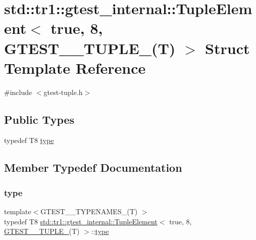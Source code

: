 \hypertarget{structstd_1_1tr1_1_1gtest__internal_1_1_tuple_element_3_01true_00_018_00_01_g_t_e_s_t__10___t_u_p_l_e___07_t_08_01_4}{}\section{std\+::tr1\+::gtest\+\_\+internal\+::Tuple\+Element$<$ true, 8, G\+T\+E\+S\+T\+\_\+\_\+\+T\+U\+P\+L\+E\+\_\+(T) $>$ Struct Template Reference}
\label{structstd_1_1tr1_1_1gtest__internal_1_1_tuple_element_3_01true_00_018_00_01_g_t_e_s_t__10___t_u_p_l_e___07_t_08_01_4}


{\ttfamily \#include $<$gtest-\/tuple.\+h$>$}

\subsection*{Public Types}
\begin{DoxyCompactItemize}
\item 
typedef T8 \mbox{\hyperlink{structstd_1_1tr1_1_1gtest__internal_1_1_tuple_element_3_01true_00_018_00_01_g_t_e_s_t__10___t_u_p_l_e___07_t_08_01_4_a7b4d456a790291b651b4179650754587}{type}}
\end{DoxyCompactItemize}


\subsection{Member Typedef Documentation}
\mbox{\label{structstd_1_1tr1_1_1gtest__internal_1_1_tuple_element_3_01true_00_018_00_01_g_t_e_s_t__10___t_u_p_l_e___07_t_08_01_4_a7b4d456a790291b651b4179650754587}} 
\subsubsection{\texorpdfstring{type}{type}}
{\footnotesize\ttfamily template$<$G\+T\+E\+S\+T\+\_\+\_\+\+T\+Y\+P\+E\+N\+A\+M\+E\+S\+\_\+(\+T) $>$ \\
typedef T8 \mbox{\hyperlink{structstd_1_1tr1_1_1gtest__internal_1_1_tuple_element}{std\+::tr1\+::gtest\+\_\+internal\+::\+Tuple\+Element}}$<$ true, 8, \mbox{\hyperlink{namespacestd_1_1tr1_aa636d3269bf1f368a7bc09ff158bc482}{G\+T\+E\+S\+T\+\_\+\_\+\+T\+U\+P\+L\+E\+\_\+}}(T) $>$\+::\mbox{\hyperlink{structstd_1_1tr1_1_1gtest__internal_1_1_tuple_element_3_01true_00_018_00_01_g_t_e_s_t__10___t_u_p_l_e___07_t_08_01_4_a7b4d456a790291b651b4179650754587}{type}}}



